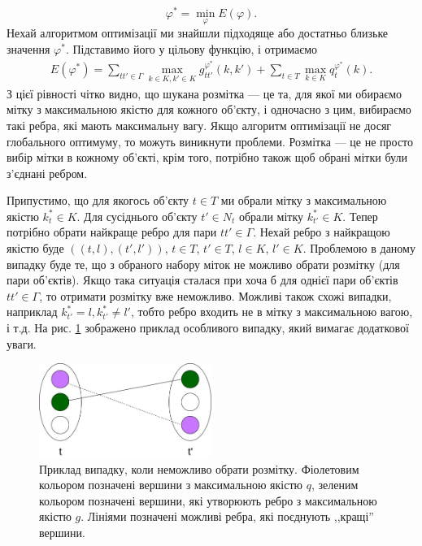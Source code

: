 \begin{equation*}
    \varphi^* = \min_{\varphi} E(\varphi).
\end{equation*}
Нехай алгоритмом оптимізації ми знайшли підходяще або достатньо близьке
значення $\varphi^*$. Підставимо його у цільову функцію, і отримаємо
\begin{equation*}
    \begin{aligned}
    E(\varphi^*) =
    \sum\limits_{tt'\in\Gamma}\max\limits_{k\in K, k'\in K}g^{\varphi^*}_{tt'}(k,k') + 
    \sum\limits_{t\in T}\max\limits_{k\in K}q^{\varphi^*}_t(k).
\end{aligned}
\end{equation*}
З цієї рівності чітко видно, що шукана розмітка --- це та, для якої ми обираємо мітку з
максимальною якістю для кожного об'єкту, і одночасно з цим, вибираємо такі ребра, які мають
максимальну вагу. Якщо алгоритм оптимізації не досяг глобального оптимуму, то 
можуть виникнути проблеми. Розмітка --- це не просто вибір мітки в кожному об'єкті, 
крім того, потрібно також щоб обрані мітки були з'єднані ребром. 

Припустимо, що
для якогось об'єкту $t\in T$ ми обрали мітку з максимальною якістю $k_t^*\in K$.
Для сусіднього об'єкту $t'\in N_t$ обрали мітку $k_{t'}^*\in K$. Тепер потрібно 
обрати найкраще ребро для пари $tt'\in\Gamma$. Нехай ребро з найкращою якістю
буде $((t,l),(t',l'))$, $t\in T$, $t'\in T$, $l\in K$, $l'\in K$. Проблемою в даному випадку
буде те, що з обраного набору міток не можливо обрати розмітку (для пари об'єктів).
Якщо така ситуація сталася при хоча б для однієї пари об'єктів $tt'\in\Gamma$, то 
отримати розмітку вже неможливо. Можливі також схожі випадки, наприклад 
$k_{t'}^*=l, k_{t'}^*\neq l'$, тобто ребро входить не в мітку з максимальною
вагою, і т.д. На рис. \ref{fig:graph_example_cross} зображено приклад особливого випадку, який
вимагає додаткової уваги.
\begin{figure}[h]
    \centering
    \includegraphics[width=0.5\textwidth]{images/multiple_choice.jpg}
    \caption{Приклад випадку, коли неможливо обрати розмітку. Фіолетовим кольором
    позначені вершини з максимальною якістю $q$, зеленим кольором позначені вершини, які
    утворюють ребро з максимальною якістю $g$. Лініями позначені можливі ребра,
    які поєднують ,,кращі'' вершини.}
    \label{fig:graph_example_cross}
  \end{figure}

